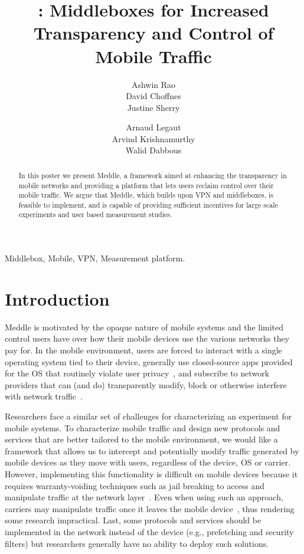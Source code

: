 \documentclass{sig-alternate-10pt}
\title{\meddle: Middleboxes for Increased Transparency and Control of Mobile Traffic }
\author{
\alignauthor
Ashwin Rao\\
\affaddr{INRIA}
\alignauthor        
David Choffnes\\
\affaddr{University of Washington}
\alignauthor
Justine Sherry\\
\affaddr{UC Berkeley}
\and
\alignauthor
Arnaud Legaut\\
\affaddr{INRIA}
\alignauthor 
Arvind Krishnamurthy\\
\affaddr{University of Washington}
\alignauthor
Walid Dabbous\\
\affaddr{INRIA}
}
\date{}
\newcommand{\meddle}{{Meddle}\xspace}
\begin{document}
	
\maketitle

\begin{abstract}
In this poster we present \meddle, a framework aimed at enhancing
the transparency in mobile networks and providing a platform that lets
users reclaim control over their mobile traffic. We argue that
\meddle, which builds upon VPN and middleboxes, is feasible to
implement, and is capable of  providing sufficient incentives for 
large scale experiments and user based measurement studies.    
\end{abstract}

\begin{keywords}
Middlebox, Mobile, VPN, Measurement platform.
\end{keywords}

\section{Introduction}

\meddle is motivated by the opaque nature of mobile systems and the
limited control users have over how their mobile devices use the
various networks they pay for. In the mobile environment, users are
forced to interact with a single operating system tied to their
device, generally use closed-source apps provided for the OS that
routinely violate user privacy~\cite{hornyack:appfence}, and subscribe
to network providers that can (and do) transparently modify, block or
otherwise interfere with network traffic~\cite{wang:middleboxes}. 

Researchers face a similar set of challenges for characterizing an
experiment for mobile systems. To characterize mobile traffic and
design new protocols and services that are better tailored to the
mobile environment, we would like a framework that allows us to
intercept and potentially modify traffic generated by mobile devices
as they move with users, regardless of the device, OS or
carrier. However, implementing this functionality is difficult on
mobile devices because it requires warranty-voiding techniques such as
jail breaking to access and manipulate traffic at the network
layer~\cite{enck:taintdroid}. Even when using such an approach,
carriers may manipulate traffic once it leaves the mobile
device~\cite{wang:middleboxes}, thus rendering some research
impractical. Last, some protocols and services should be implemented
in the network instead of the device (e.g., prefetching and security
filters) but researchers generally have no ability to deploy such
solutions.
\end{document}

